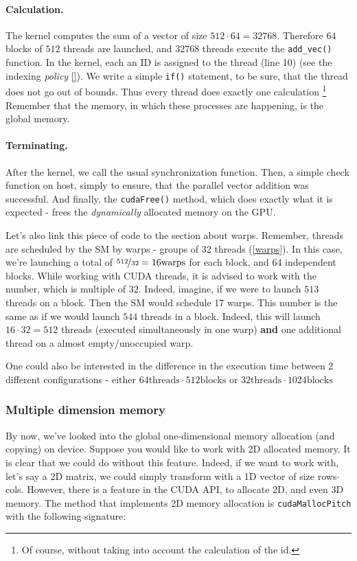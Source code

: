 \documentclass[12pt]{article}
\begin{document}
\vspace{-0.8cm}
\paragraph{Calculation.} The kernel computes the sum of a vector of size $512\cdot 64 = 32768$. 
Therefore $64$ blocks of $512$ threads are launched, and $32768$ threads execute the \verb|add_vec()|
function. In the kernel, each an ID is assigned to the thread (line 10) (see the indexing \textit{policy} \autoref{}). 
We write a simple \verb|if()| statement, to be sure, that the thread does not go out of bounds.
Thus every thread does exactly one calculation \footnote{Of course, without taking into account the calculation of the id.}
Remember that the memory, in which these processes are happening, is the global memory. 

\vspace{-0.8cm}
\paragraph{Terminating.} After the kernel, we call the usual synchronization function. 
Then, a simple check function on host, simply to ensure, that the parallel vector addition was successful.
And finally, the \verb|cudaFree()| method, which does exactly what it is expected - 
frees the \textit{dynamically} allocated memory on the GPU.

Let's also link this piece of code to the section about warps. Remember, 
threads are scheduled by the SM by warps - groups of 32 threads (\autoref{warps}). 
In this case, we're launching a total of $\nicefrac{512}{32} = 16 \text{warps}$ for each 
block, and 64 independent blocks. While working with CUDA threads, it is advised to work with 
the number, which is multiple of $32$. Indeed, imagine, if we were to launch $513$ threads on a block.
Then the SM would schedule 17 warps. This number is the same as if we would launch $544$ threads in a block.
Indeed, this will launch $16\cdot 32 = 512$ threads (executed simultaneously in one warp) \textbf{and} 
one additional thread on a almost empty/unoccupied warp. 

One could also be interested in the difference in the execution time between 2 different
 configurations - either $64\text{threads}\cdot 512\text{blocks}$ or $32\text{threads}\cdot 1024\text{blocks}$

\subsubsection{Multiple dimension memory}
By now, we've looked into the global one-dimensional 
memory allocation (and copying) on device. Suppose you would like to work 
with 2D allocated memory. It is clear that we could do without this feature. 
Indeed, if we want to work with, let's say a 2D matrix, we could simply 
transform with a 1D vector of size rows$\cdot$cols.
However, there is a feature in the CUDA API, to allocate 2D, and even 
3D memory\cite{MemoryAlignment}. 
The method that implements 2D memory allocation is \verb|cudaMallocPitch| with the following signature:
\end{document}

